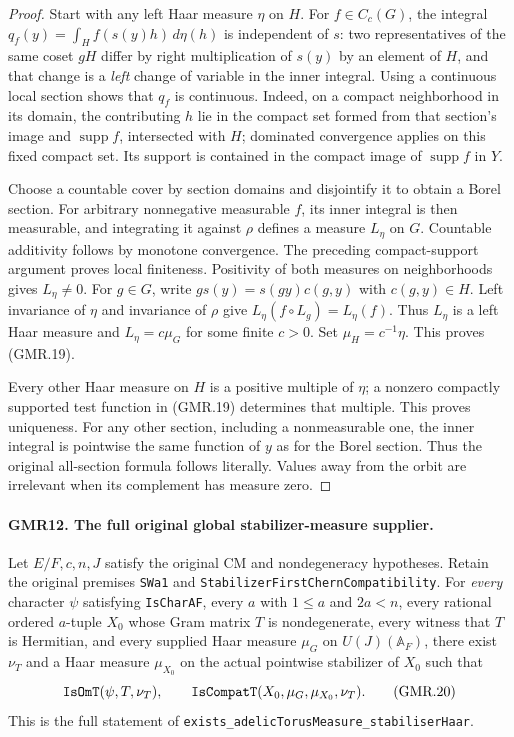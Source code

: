 \documentclass[11pt,a4paper]{article}
\numberwithin{equation}{section}
\theoremstyle{remark}\newtheorem{remark}[theorem]{Remark}
\begin{document}
\begin{proof}
Start with any left Haar measure $\eta$ on $H$.  For $f\in C_c(G)$,
the integral $q_f(y)=\int_H f(s(y)h)\,d\eta(h)$ is independent of $s$:
two representatives of the same coset $gH$ differ by right
multiplication of $s(y)$ by an element of $H$, and that change is a
\emph{left} change of variable in the inner integral.
Using a continuous local section shows that $q_f$ is continuous.
Indeed, on a compact neighborhood in its domain, the contributing
$h$ lie in the compact set formed from that section's image and
$\operatorname{supp}f$, intersected with $H$; dominated convergence
applies on this fixed compact set.  Its support is contained in the
compact image of $\operatorname{supp}f$ in $Y$.

Choose a countable cover by section domains and disjointify it to
obtain a Borel section.  For arbitrary nonnegative measurable $f$, its
inner integral is then measurable, and integrating it against $\rho$
defines a measure $L_\eta$ on $G$.  Countable additivity follows by
monotone convergence.  The preceding compact-support argument proves
local finiteness.  Positivity of both measures on neighborhoods gives
$L_\eta\ne0$.
For $g\in G$, write $g s(y)=s(gy)c(g,y)$ with $c(g,y)\in H$.
Left invariance of $\eta$ and invariance of $\rho$ give
$L_\eta(f\circ L_g)=L_\eta(f)$.  Thus $L_\eta$ is a left Haar measure
and $L_\eta=c\mu_G$ for some finite $c>0$.
Set $\mu_H=c^{-1}\eta$.  This proves (GMR.19).

Every other Haar measure on $H$ is a positive multiple of $\eta$;
a nonzero compactly supported test function in (GMR.19) determines
that multiple.  This proves uniqueness.  For any other section,
including a nonmeasurable one, the inner integral is pointwise the
same function of $y$ as for the Borel section.  Thus the original
all-section formula follows literally.  Values away from the orbit
are irrelevant when its complement has measure zero.
\end{proof}

\paragraph{GMR12. The full original global stabilizer-measure supplier.}
\label{claim:GMR12}
Let $E/F,c,n,J$ satisfy the original CM and nondegeneracy hypotheses.
Retain the original premises \texttt{SWa1} and
\texttt{Stabilizer\allowbreak First\allowbreak Chern\allowbreak Compatibility}.  For \emph{every} character
$\psi$ satisfying \texttt{Is\allowbreak Char\allowbreak AF}, every $a$ with $1\leq a$ and
$2a<n$, every rational ordered $a$-tuple $X_0$ whose Gram matrix
$T$ is nondegenerate, every witness that $T$ is Hermitian, and every
supplied Haar measure $\mu_G$ on $U(J)(\mathbb A_F)$, there exist
$\nu_T$ and a Haar measure $\mu_{X_0}$ on the actual pointwise
stabilizer of $X_0$ such that
\[
 \texttt{Is\allowbreak Om\allowbreak T}(\psi,T,\nu_T),\qquad
 \texttt{Is\allowbreak Compat\allowbreak T}(X_0,\mu_G,\mu_{X_0},\nu_T).
 \tag{GMR.20}
\]
This is the full statement of
\texttt{exists\_\allowbreak adelic\allowbreak Torus\allowbreak Measure\_\allowbreak stabiliser\allowbreak Haar}.
\end{document}
